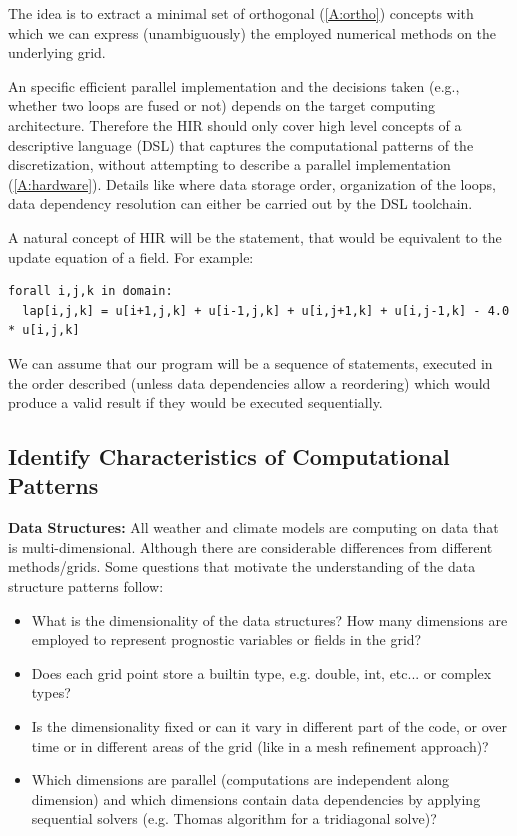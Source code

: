 \documentclass[a4paper,10pt]{scrartcl}
\begin{document}
The idea is to extract a minimal set of orthogonal (\ref{A:ortho}) concepts with which we can express (unambiguously) the employed numerical methods on the underlying grid.

An specific efficient parallel implementation and the decisions taken (e.g., whether two loops are fused or not)
depends on the target computing architecture. Therefore the HIR should only cover high level concepts of a
descriptive language (DSL) that captures the computational patterns of the discretization, without attempting
to describe a parallel implementation (\ref{A:hardware}).
Details like where data storage order, organization of the loops, data dependency resolution can
either be carried out by the DSL toolchain.

A natural concept of HIR will be the statement, that would be equivalent to the update equation of a field. For example:
\begin{lstlisting}
forall i,j,k in domain:
  lap[i,j,k] = u[i+1,j,k] + u[i-1,j,k] + u[i,j+1,k] + u[i,j-1,k] - 4.0 * u[i,j,k]
\end{lstlisting}

\begin{longfbox}[rounded]
We can assume that our program will be a sequence of statements, executed in the order described (unless data
dependencies allow a reordering) which would produce a valid result if they would be executed sequentially.
\end{longfbox}

\subsection{Identify Characteristics of Computational Patterns}
\label{sec:idPattern}

\textbf{Data Structures:}\newline
All weather and climate models are computing on data that is multi-dimensional. Although there are considerable differences
from different methods/grids. Some questions that motivate the understanding of the data structure patterns follow:
\begin{itemize}
	\item What is the dimensionality of the data structures? How many dimensions are employed to represent prognostic variables or fields in the grid?
	\item Does each grid point store a builtin type, e.g. double, int, etc... or complex types?
	\item Is the dimensionality fixed or can it vary in different part of the code, or over time or in different areas of the grid (like in a mesh refinement approach)? 
	  \item Which dimensions are parallel (computations are independent along dimension) and which dimensions contain data dependencies by applying sequential solvers (e.g. Thomas algorithm for a tridiagonal solve)?
\end{itemize}
\end{document}
